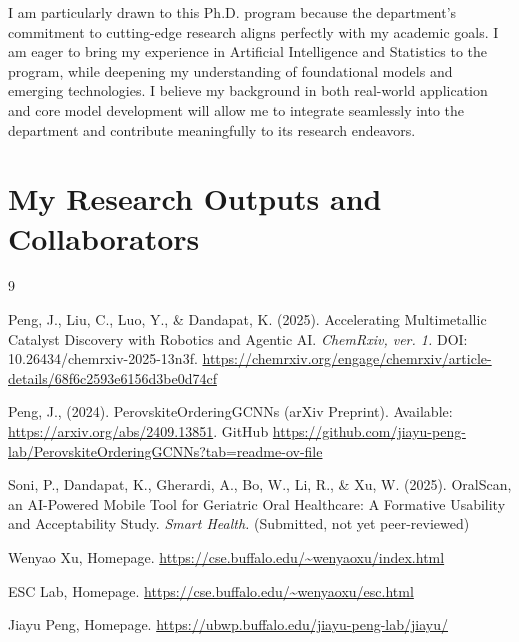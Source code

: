\documentclass[12pt, letterpaper]{article}
\begin{document}
I am particularly drawn to this Ph.D. program because the department's commitment to cutting-edge research aligns perfectly with my academic goals. I am eager to bring my experience in Artificial Intelligence and Statistics to the program, while deepening my understanding of foundational models and emerging technologies. I believe my background in both real-world application and core model development will allow me to integrate seamlessly into the department and contribute meaningfully to its research endeavors.


\section*{My Research Outputs and Collaborators}
\begin{thebibliography}{9}

Peng, J., Liu, C., Luo, Y., \& Dandapat, K. (2025). Accelerating Multimetallic Catalyst Discovery with Robotics and Agentic AI. \textit{ChemRxiv, ver. 1.} DOI: 10.26434/chemrxiv-2025-13n3f. \url{https://chemrxiv.org/engage/chemrxiv/article-details/68f6c2593e6156d3be0d74cf}

Peng, J., (2024). PerovskiteOrderingGCNNs (arXiv Preprint). Available: \url{https://arxiv.org/abs/2409.13851}. GitHub \url{https://github.com/jiayu-peng-lab/PerovskiteOrderingGCNNs?tab=readme-ov-file}

Soni, P., Dandapat, K., Gherardi, A., Bo, W., Li, R., \& Xu, W. (2025). OralScan, an AI-Powered Mobile Tool for Geriatric Oral Healthcare: A Formative Usability and Acceptability Study. \textit{Smart Health.} (Submitted, not yet peer-reviewed)

Wenyao Xu, Homepage. \url{https://cse.buffalo.edu/~wenyaoxu/index.html}

ESC Lab, Homepage. \url{https://cse.buffalo.edu/~wenyaoxu/esc.html}

Jiayu Peng, Homepage. \url{https://ubwp.buffalo.edu/jiayu-peng-lab/jiayu/}

\end{thebibliography}
\end{document}
